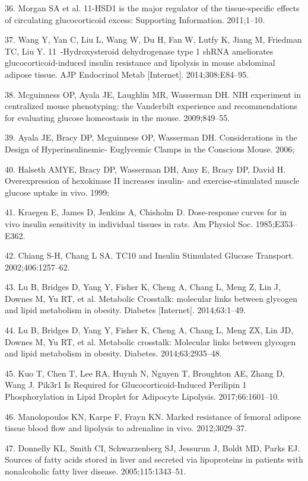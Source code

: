 \documentclass[11pt]{article} %
\begin{document}
36. Morgan SA et al. 11-HSD1 is the major regulator of the
tissue-specific effects of circulating glucocorticoid excess: Supporting
Information. 2011;1--10.

37. Wang Y, Yan C, Liu L, Wang W, Du H, Fan W, Lutfy K, Jiang M,
Friedman TC, Liu Y. 11~-Hydroxysteroid dehydrogenase type 1 shRNA
ameliorates glucocorticoid-induced insulin resistance and lipolysis in
mouse abdominal adipose tissue. AJP Endocrinol Metab {[}Internet{]}.
2014;308:E84--95. 

38. Mcguinness OP, Ayala JE, Laughlin MR, Wasserman DH. NIH experiment
in centralized mouse phenotyping: the Vanderbilt experience and
recommendations for evaluating glucose homeostasis in the mouse.
2009;849--55.

39. Ayala JE, Bracy DP, Mcguinness OP, Wasserman DH. Considerations in
the Design of Hyperinsulinemic- Euglycemic Clamps in the Conscious
Mouse. 2006;

40. Halseth AMYE, Bracy DP, Wasserman DH, Amy E, Bracy DP, David H.
Overexpression of hexokinase II increases insulin- and
exercise-stimulated muscle glucose uptake in vivo. 1999;

41. Kraegen E, James D, Jenkins A, Chisholm D. Dose-response curves for
in vivo insulin sensitivity in individual tissues in rats. Am Physiol
Soc. 1985;E353--E362.

42. Chiang S-H, Chang L SA. TC10 and Insulin  Stimulated Glucose
Transport. 2002;406:1257--62.

43. Lu B, Bridges D, Yang Y, Fisher K, Cheng A, Chang L, Meng Z, Lin J,
Downes M, Yu RT, et al. Metabolic Crosstalk: molecular links between
glycogen and lipid metabolism in obesity. Diabetes {[}Internet{]}.
2014;63:1--49.

44. Lu B, Bridges D, Yang Y, Fisher K, Cheng A, Chang L, Meng ZX, Lin
JD, Downes M, Yu RT, et al. Metabolic crosstalk: Molecular links between
glycogen and lipid metabolism in obesity. Diabetes. 2014;63:2935--48.

45. Kuo T, Chen T, Lee RA, Huynh N, Nguyen T, Broughton AE, Zhang D,
Wang J. Pik3r1 Is Required for Glucocorticoid-Induced Perilipin 1
Phosphorylation in Lipid Droplet for Adipocyte Lipolysis.
2017;66:1601--10.

46. Manolopoulos KN, Karpe F, Frayn KN. Marked resistance of femoral
adipose tissue blood flow and lipolysis to adrenaline in vivo.
2012;3029--37.

47. Donnelly KL, Smith CI, Schwarzenberg SJ, Jessurun J, Boldt MD, Parks
EJ. Sources of fatty acids stored in liver and secreted via lipoproteins
in patients with nonalcoholic fatty liver disease. 2005;115:1343--51.
\end{document}
